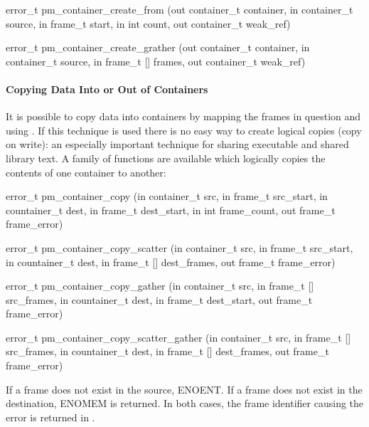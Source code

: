 \begin{code}
error\_t pm\_container\_create\_from (out container\_t container, in
container\_t source, in frame\_t start, in int count, out container\_t
weak\_ref)
\end{code}

\begin{code}
error\_t pm\_container\_create\_grather (out container\_t container,
in container\_t source, in frame\_t [] frames, out container\_t
weak\_ref)
\end{code}

\paragraph{Copying Data Into or Out of Containers}

It is possible to copy data into containers by mapping the frames in
question and using .  If this technique is used there
is no easy way to create logical copies (copy on write): an especially
important technique for sharing executable and shared library text.  A
family of functions are available which logically copies the contents
of one container to another:

\begin{code}
error\_t pm\_container\_copy (in container\_t src, in frame\_t
src\_start, in countainer\_t dest, in frame\_t dest\_start, in int
frame\_count, out frame\_t frame\_error)
\end{code}

\begin{code}
error\_t pm\_container\_copy\_scatter (in container\_t src, in
frame\_t src\_start, in countainer\_t dest, in frame\_t []
dest\_frames, out frame\_t frame\_error)
\end{code}

\begin{code}
error\_t pm\_container\_copy\_gather (in container\_t src, in frame\_t
[] src\_frames, in countainer\_t dest, in frame\_t dest\_start, out
frame\_t frame\_error)
\end{code}

\begin{code}
error\_t pm\_container\_copy\_scatter\_gather (in container\_t src, in
frame\_t [] src\_frames, in countainer\_t dest, in frame\_t []
dest\_frames, out frame\_t frame\_error)
\end{code}

If a frame does not exist in the source, ENOENT.  If a frame does not
exist in the destination, ENOMEM is returned.  In both cases, the
frame identifier causing the error is returned in
.

